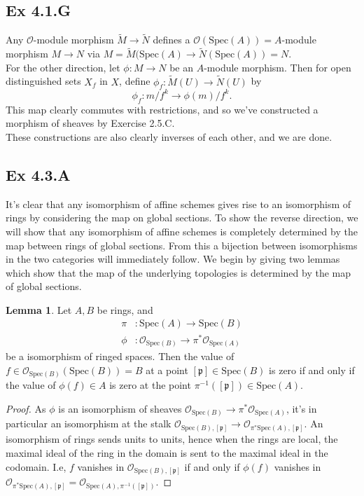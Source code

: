 \documentclass{article}
\theoremstyle{definition}
\newtheorem{lemma}[theorem]{Lemma}
\newcommand{\oo}{\mathcal{O}}
\newcommand{\osp}[1]{\oo_{\Spec\left(#1\right)}}
\newcommand{\Spec}{\text{Spec}}
\begin{document}
\subsection*{Ex 4.1.G}

Any $\mathcal{O}$-module morphism $\widetilde{M} \to \widetilde{N}$ defines a
$\mathcal{O}(\Spec(A)) = A$-module morphism $M \to N$ via $M =
\widetilde{M}(\Spec(A) \to \widetilde{N}(\Spec(A)) = N$. \\

For the other direction, let $\phi : M \to N$ be an $A$-module morphism. Then
for open distinguished sets $X_f$ in $X$, define $\phi_f : \widetilde{M}(U) \to
\widetilde{N}(U)$ by
\[
	\phi_f 
	:
	m/f^k
	\to
	\phi(m)/f^k.
\]
This map clearly commutes with restrictions, and so we've constructed a
morphism of sheaves by Exercise 2.5.C. \\

These constructions are also clearly inverses of each other, and we are done.

\subsection*{Ex 4.3.A}

It's clear that any isomorphism of affine schemes gives rise to an isomorphism
of rings by considering the map on global sections. To show the reverse
direction, we will show that any isomorphism of affine schemes is completely
determined by the map between rings of global sections. From this a bijection
between isomorphisms in the two categories will immediately follow. We begin by
giving two lemmas which show that the map of the underlying topologies is
determined by the map of global sections.

\begin{lemma}
	Let $A, B$ be rings, and 
	\begin{align*}
		\pi &: \Spec(A) \to \Spec(B) \\
		\phi &: \osp{B} \to \pi^*\osp{A}
	\end{align*}
	be a isomorphism of ringed spaces. Then the value of $f \in
	\osp{B}(\Spec(B)) = B$ at a point $[\mathfrak{p}] \in \Spec(B)$ is zero if
	and only if the value of $\phi(f) \in A$ is zero at the point
	$\pi^{-1}([\mathfrak{p}]) \in \Spec(A)$.
\end{lemma}
\begin{proof}
	As $\phi$ is an isomorphism of sheaves $\osp{B} \to \pi^*\osp{A}$, it's in
	particular an isomorphism at the stalk $\oo_{\Spec(B), [\mathfrak{p}]} \to
	\oo_{\pi^* \Spec(A), [\mathfrak{p}]}$. An isomorphism of rings sends units
	to units, hence when the rings are local, the maximal ideal of the ring in
	the domain is sent to the maximal ideal in the codomain. I.e, $f$ vanishes
	in $\oo_{\Spec(B), [\mathfrak{p}]}$ if and only if $\phi(f)$ vanishes in
	$\oo_{\pi^* \Spec(A), [\mathfrak{p}]} = \oo_{\Spec(A),
	\pi^{-1}([\mathfrak{p}])}$.
\end{proof}
\end{document}
